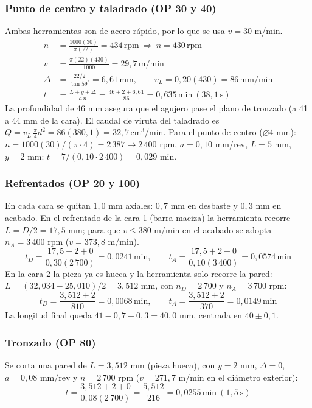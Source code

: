 \documentclass[12pt,a4paper]{article}
\newcommand{\umm}{\,\mathrm{mm}}
\newcommand{\umin}{\,\mathrm{min}}
\newcommand{\urpm}{\,\mathrm{rpm}}
\newcommand{\umpm}{\,\mathrm{m/min}}
\newcommand{\ummmin}{\,\mathrm{mm/min}}
\newcommand{\ucmmin}{\,\mathrm{cm^3/min}}
\begin{document}
\subsubsection{Punto de centro y taladrado (OP 30 y 40)}

Ambas herramientas son de acero rápido, por lo que se usa $v=30$ m/min.
\begin{align*}
	n      & =\frac{1000(30)}{\pi(22)}=434\urpm\ \Rightarrow\ n=430\urpm                      \\
	v      & =\frac{\pi(22)(430)}{1000}=29{,}7\umpm                                           \\
	\Delta & =\frac{22/2}{\tan 59^\circ}=6{,}61\umm,\qquad v_L=0{,}20(430)=86\ummmin          \\
	t      & =\frac{L+y+\Delta}{a\,n}=\frac{46+2+6{,}61}{86}=0{,}635\umin\ (38{,}1\ \text{s})
\end{align*}
La profundidad de 46 mm asegura que el agujero pase el plano de tronzado (a 41 a
44 mm de la cara). El caudal de viruta del taladrado es
$Q=v_L\,\frac{\pi}{4}d^2=86(380{,}1)=32{,}7\ucmmin$. Para el punto de centro
($\varnothing4$ mm): $n=1000(30)/(\pi\cdot4)=2\,387\to2\,400$ rpm, $a=0{,}10$
mm/rev, $L=5$ mm, $y=2$ mm: $t=7/(0{,}10\cdot2\,400)=0{,}029$ min.

\subsubsection{Refrentados (OP 20 y 100)}

En cada cara se quitan $1{,}0$ mm axiales: $0{,}7$ mm en desbaste y $0{,}3$ mm en
acabado. En el refrentado de la cara 1 (barra maciza) la herramienta recorre
$L=D/2=17{,}5$ mm; para que $v\le380$ m/min en el acabado se adopta
$n_A=3\,400$ rpm ($v=373{,}8$ m/min).
\[
	t_D=\frac{17{,}5+2+0}{0{,}30(2\,700)}=0{,}0241\umin,\qquad
	t_A=\frac{17{,}5+2+0}{0{,}10(3\,400)}=0{,}0574\umin
\]
En la cara 2 la pieza ya es hueca y la herramienta solo recorre la pared:
$L=(32{,}034-25{,}010)/2=3{,}512$ mm, con $n_D=2\,700$ y $n_A=3\,700$ rpm:
\[
	t_D=\frac{3{,}512+2}{810}=0{,}0068\umin,\qquad
	t_A=\frac{3{,}512+2}{370}=0{,}0149\umin
\]
La longitud final queda $41-0{,}7-0{,}3=40{,}0$ mm, centrada en $40\pm0{,}1$.

\subsubsection{Tronzado (OP 80)}

Se corta una pared de $L=3{,}512$ mm (pieza hueca), con $y=2$ mm, $\Delta=0$,
$a=0{,}08$ mm/rev y $n=2\,700$ rpm ($v=271{,}7$ m/min en el diámetro exterior):
\[
	t=\frac{3{,}512+2+0}{0{,}08(2\,700)}=\frac{5{,}512}{216}=0{,}0255\umin\ (1{,}5\ \text{s})
\]
\end{document}
